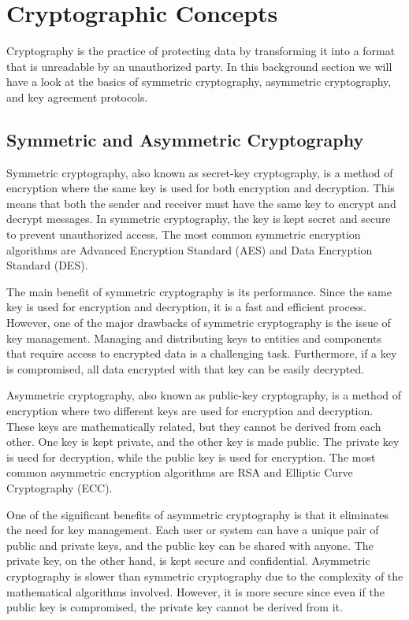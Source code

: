 \section{Cryptographic Concepts}
\label{sec:cryptographic-concepts}

Cryptography is the practice of protecting data by transforming it into a format
that is unreadable by an unauthorized party. In this background section we will
have a look at the basics of symmetric cryptography, asymmetric cryptography,
and key agreement protocols.

\subsection{Symmetric and Asymmetric Cryptography}
\label{sec:symmetric-asymmetric-cryptography}

Symmetric cryptography, also known as secret-key cryptography, is a method of
encryption where the same key is used for both encryption and decryption. This
means that both the sender and receiver must have the same key to encrypt and
decrypt messages. In symmetric cryptography, the key is kept secret and secure
to prevent unauthorized access. The most common symmetric encryption algorithms
are Advanced Encryption Standard (AES) and Data Encryption Standard (DES).

The main benefit of symmetric cryptography is its performance. Since the same
key is used for encryption and decryption, it is a fast and efficient process.
However, one of the major drawbacks of symmetric cryptography is the issue of
key management. Managing and distributing keys to entities and components that
require access to encrypted data is a challenging task. Furthermore, if a key is
compromised, all data encrypted with that key can be easily decrypted.

Asymmetric cryptography, also known as public-key cryptography, is a method of
encryption where two different keys are used for encryption and decryption.
These keys are mathematically related, but they cannot be derived from each
other. One key is kept private, and the other key is made public. The private
key is used for decryption, while the public key is used for encryption. The
most common asymmetric encryption algorithms are RSA and Elliptic Curve
Cryptography (ECC).

One of the significant benefits of asymmetric cryptography is that it eliminates
the need for key management. Each user or system can have a unique pair of
public and private keys, and the public key can be shared with anyone. The
private key, on the other hand, is kept secure and confidential. Asymmetric
cryptography is slower than symmetric cryptography due to the complexity of the
mathematical algorithms involved. However, it is more secure since even if the
public key is compromised, the private key cannot be derived from it.

